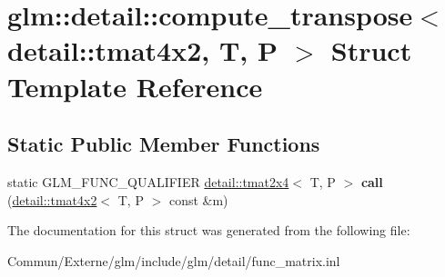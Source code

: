 \hypertarget{structglm_1_1detail_1_1compute__transpose_3_01detail_1_1tmat4x2_00_01_t_00_01_p_01_4}{}\section{glm\+:\+:detail\+:\+:compute\+\_\+transpose$<$ detail\+:\+:tmat4x2, T, P $>$ Struct Template Reference}
\label{structglm_1_1detail_1_1compute__transpose_3_01detail_1_1tmat4x2_00_01_t_00_01_p_01_4}
\subsection*{Static Public Member Functions}
\begin{DoxyCompactItemize}
\item 
static G\+L\+M\+\_\+\+F\+U\+N\+C\+\_\+\+Q\+U\+A\+L\+I\+F\+I\+ER \hyperlink{structglm_1_1detail_1_1tmat2x4}{detail\+::tmat2x4}$<$ T, P $>$ {\bfseries call} (\hyperlink{structglm_1_1detail_1_1tmat4x2}{detail\+::tmat4x2}$<$ T, P $>$ const \&m)\hypertarget{structglm_1_1detail_1_1compute__transpose_3_01detail_1_1tmat4x2_00_01_t_00_01_p_01_4_a345735a0a7bc0fa49d41693771b8c72e}{}\label{structglm_1_1detail_1_1compute__transpose_3_01detail_1_1tmat4x2_00_01_t_00_01_p_01_4_a345735a0a7bc0fa49d41693771b8c72e}

\end{DoxyCompactItemize}


The documentation for this struct was generated from the following file\+:\begin{DoxyCompactItemize}
\item 
Commun/\+Externe/glm/include/glm/detail/func\+\_\+matrix.\+inl\end{DoxyCompactItemize}
